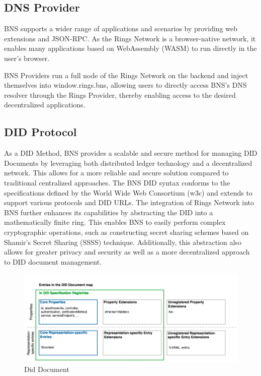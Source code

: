 \documentclass[twocolumn]{article}
\begin{document}
\subsection{DNS Provider}
BNS supports a wider range of applications and scenarios by providing web extensions and JSON-RPC. As the Rings Network is a browser-native network, it enables many applications based on WebAssembly (WASM) to run directly in the user's browser.

BNS Providers run a full node of the Rings Network on the backend and inject themselves into window.rings.bns, allowing users to directly access BNS's DNS resolver through the Rings Provider, thereby enabling access to the desired decentralized applications.
\subsection{DID Protocol}

As a DID Method, BNS provides a scalable and secure method for managing DID Documents by leveraging both distributed ledger technology and a decentralized network. This allows for a more reliable and secure solution compared to traditional centralized approaches. The BNS DID syntax conforms to the specifications defined by the World Wide Web Consortium (w3c) and extends to support various protocols and DID URLs. The integration of Rings Network into BNS further enhances its capabilities by abstracting the DID into a mathematically finite ring. This enables BNS to easily perform complex cryptographic operations, such as constructing secret sharing schemes based on Shamir's Secret Sharing (SSSS) technique. Additionally, this abstraction also allows for greater privacy and security as well as a more decentralized approach to DID document management.


\begin{figure}[htbp]
  \includegraphics[width=\linewidth]{imgs/diddoc.png}
  \caption{Did Document}
  \label{diddoc}

\end{figure}
\end{document}
